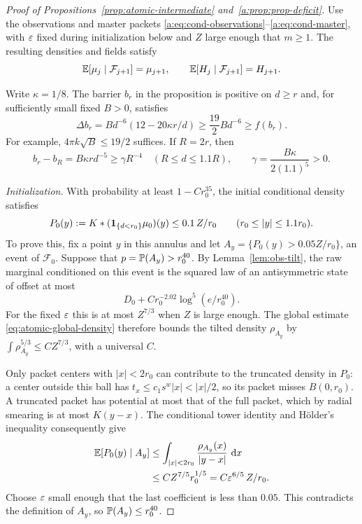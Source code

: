 \begin{proof}[Proof of Propositions~\ref{prop:atomic-intermediate} and~\ref{a:prop:prop-deficit}]
Use the observations and master packets
\eqref{a:eq:cond-observations}--\eqref{a:eq:cond-master}, with $\varepsilon$
fixed during initialization below and $Z$ large enough that $m\ge1$.
The resulting densities and fields satisfy
\begin{equation}
\label{a:eq:prop-master-recall}
 \mathbb E[\mu_j\mid\mathcal F_{j+1}]=\mu_{j+1},\qquad
 \mathbb E[H_j\mid\mathcal F_{j+1}]=H_{j+1}.
\end{equation}

Write $\kappa=1/8$. The barrier $b_r$ in the proposition is positive
on $d\ge r$ and, for sufficiently small fixed $B>0$, satisfies
\begin{equation}
\label{a:eq:prop-barrier}
 \Delta b_r=Bd^{-6}(12-20\kappa r/d)
 \ge\frac{19}{2}Bd^{-6}\ge f(b_r).
\end{equation}
For example, $4\pi k\sqrt B\le19/2$ suffices.  If $R=2r$, then
\begin{equation}
\label{a:eq:prop-gap}
 b_r-b_R=B\kappa r d^{-5}\ge\gamma R^{-4}
 \quad(R\le d\le1.1R),\qquad
 \gamma=\frac{B\kappa}{2(1.1)^5}>0.
\end{equation}

\emph{Initialization.}
With probability at least $1-Cr_0^{35}$, the initial conditional density
satisfies
\begin{equation}
\label{a:eq:prop-init-good}
 P_0(y):=K*(\mathbf 1_{\{d<r_0\}}\mu_0)(y)
 \le0.1\,Z/r_0\qquad(r_0\le |y|\le1.1r_0).
\end{equation}
To prove this, fix a point $y$ in this annulus and let
$A_y=\{P_0(y)>0.05Z/r_0\}$, an event of $\mathcal F_0$.
Suppose that $p=\mathbb P(A_y)>r_0^{40}$.  By
Lemma~\ref{lem:obs-tilt}, the raw marginal conditioned on this event
is the squared law of an antisymmetric state of offset at most
\[
 D_0+C r_0^{-2.02}\log^5(e/r_0^{40}).
\]
For the fixed $\varepsilon$ this is at most $Z^{7/3}$ when $Z$ is large
enough.  The global estimate \eqref{eq:atomic-global-density} therefore bounds
the tilted density $\rho_{A_y}$ by
$\int\rho_{A_y}^{5/3}\le C Z^{7/3}$, with a universal $C$.

Only packet centers with $|x|<2r_0$ can contribute to the truncated
density in $P_0$: a center outside this ball has
$t_x\le c_1s^w|x|<|x|/2$, so its packet misses $B(0,r_0)$.
A truncated packet has potential at most that of the full packet,
which by radial smearing is at most $K(y-x)$.  The conditional tower
identity and H\"older's inequality consequently give
\begin{align*}
 \mathbb E[P_0(y)\mid A_y]
 &\le\int_{|x|<2r_0}\frac{\rho_{A_y}(x)}{|y-x|}\,\,\mathrm d x\\
 &\le C Z^{7/5}r_0^{1/5}
   =C\varepsilon^{6/5}\,Z/r_0.
\end{align*}
Choose $\varepsilon$ small enough that the last coefficient is less than
$0.05$.  This contradicts the definition of $A_y$, so
$\mathbb P(A_y)\le r_0^{40}$.


\end{proof}
